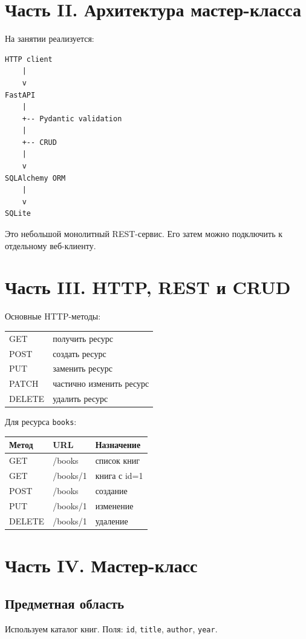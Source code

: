 \documentclass[12pt,a4paper]{article}
\begin{document}
\section{Часть II. Архитектура мастер-класса}
На занятии реализуется:
\begin{verbatim}
HTTP client
    |
    v
FastAPI
    |
    +-- Pydantic validation
    |
    +-- CRUD
    |
    v
SQLAlchemy ORM
    |
    v
SQLite
\end{verbatim}
Это небольшой монолитный REST-сервис. Его затем можно подключить к отдельному веб-клиенту.

\section{Часть III. HTTP, REST и CRUD}
Основные HTTP-методы:
\begin{center}
\begin{tabular}{ll}
\toprule
GET & получить ресурс\\
POST & создать ресурс\\
PUT & заменить ресурс\\
PATCH & частично изменить ресурс\\
DELETE & удалить ресурс\\
\bottomrule
\end{tabular}
\end{center}

Для ресурса \texttt{books}:
\begin{center}
\begin{tabular}{lll}
\toprule
Метод & URL & Назначение\\
\midrule
GET & /books & список книг\\
GET & /books/1 & книга с id=1\\
POST & /books & создание\\
PUT & /books/1 & изменение\\
DELETE & /books/1 & удаление\\
\bottomrule
\end{tabular}
\end{center}

\section{Часть IV. Мастер-класс}
\subsection{Предметная область}
Используем каталог книг. Поля: \texttt{id}, \texttt{title}, \texttt{author}, \texttt{year}.
\end{document}
